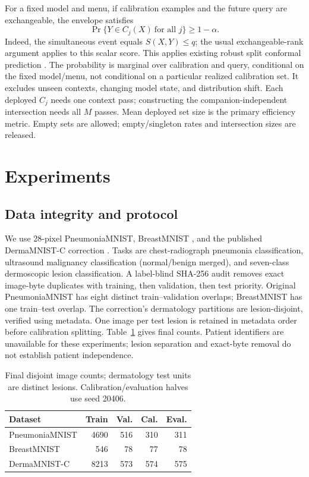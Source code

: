 \documentclass{article}
\begin{document}
For a fixed model and menu, if calibration examples and the future query are exchangeable, the envelope satisfies
\begin{equation}
 \Pr\{Y\in C_j(X)\ \text{for all }j\}\ge1-\alpha.
\end{equation}
Indeed, the simultaneous event equals $S(X,Y)\le q$; the usual exchangeable-rank argument applies to this scalar score. This applies existing robust split conformal prediction \cite{massena}. The probability is marginal over calibration and query, conditional on the fixed model/menu, not conditional on a particular realized calibration set. It excludes unseen contexts, changing model state, and distribution shift. Each deployed $C_j$ needs one context pass; constructing the companion-independent intersection needs all $M$ passes. Mean deployed set size is the primary efficiency metric. Empty sets are allowed; empty/singleton rates and intersection sizes are released.

\section{Experiments}
\subsection{Data integrity and protocol}
We use 28-pixel PneumoniaMNIST, BreastMNIST \cite{medmnist,kermany,breast}, and the published DermaMNIST-C correction \cite{dermac,ham}. Tasks are chest-radiograph pneumonia classification, ultrasound malignancy classification (normal/benign merged), and seven-class dermoscopic lesion classification. A label-blind SHA-256 audit removes exact image-byte duplicates with training, then validation, then test priority. Original PneumoniaMNIST has eight distinct train--validation overlaps; BreastMNIST has one train--test overlap. The correction's dermatology partitions are lesion-disjoint, verified using metadata. One image per test lesion is retained in metadata order before calibration splitting. Table~\ref{tab:data} gives final counts. Patient identifiers are unavailable for these experiments; lesion separation and exact-byte removal do not establish patient independence.

\begin{table}[t]
\centering
\caption{Final disjoint image counts; dermatology test units are distinct lesions. Calibration/evaluation halves use seed 20406.}
\label{tab:data}
\begin{tabular}{lrrrr}\toprule
Dataset & Train & Val. & Cal. & Eval.\\\midrule
PneumoniaMNIST & 4690 & 516 & 310 & 311\\
BreastMNIST & 546 & 78 & 77 & 78\\
DermaMNIST-C & 8213 & 573 & 574 & 575\\\bottomrule
\end{tabular}
\end{table}
\end{document}
